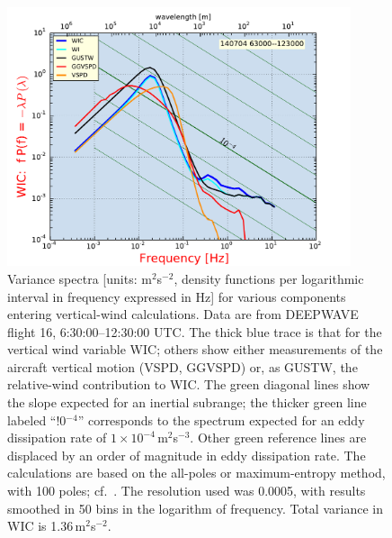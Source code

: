 \documentclass[12pt,twoside,english]{article}\usepackage[]{graphicx}\usepackage[]{color}
\let\OrgIndex\index
\renewcommand*{\index}[1]{\OrgIndex{#1}}
\begin{document}
\begin{figure}
\noindent \begin{centering}
\includegraphics[width=0.9\textwidth]{SpecialGraphics/VSPDspectraDW16.pdf}  
\par\end{centering}

\protect\caption[Variance spectra for various components entering vertical-wind calculations.]{\label{fig:Variance-spectra-VSPD}Variance spectra {[}units: m$^{2}$s$^{-2}$, density functions per logarithmic interval in frequency expressed in Hz{]} for various components entering vertical-wind calculations. Data are from DEEPWAVE flight 16, 6:30:00--12:30:00 UTC. The thick blue trace is that for the vertical wind variable WIC; others show either measurements of the aircraft vertical motion (VSPD, GGVSPD) or, as GUSTW, the relative-wind contribution to WIC. The green diagonal lines show the slope expected for an inertial subrange; the thicker green line labeled ``!0$^{-4}$'' corresponds to the spectrum expected for an eddy dissipation rate of $1\times10^{-4}$\,m$^{2}$s$^{-3}$. Other green reference lines are displaced by an order of magnitude in eddy dissipation rate. The calculations are based on the all-poles or maximum-entropy method, with 100 poles; cf.~\citet{Press:1992:NRC:148286}. The resolution used was 0.0005, with results smoothed in 50 bins in the logarithm of frequency. Total variance in WIC is 1.36\,m$^{2}$s$^{-2}$.} 
\end{figure}
\end{document}
